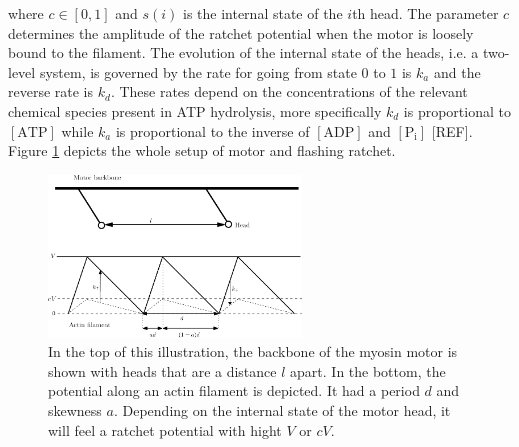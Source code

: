 \documentclass[aps,pre,onecolumn,showpacs,showkeys,a4paper]{revtex4}
\begin{document}
where $c\in\left[0,1\right]$ and $s(i)$ is the internal state of the $i$th head. 
The parameter $c$ determines the amplitude of the ratchet potential when the motor is loosely bound to the filament. 
The evolution of the internal state of the heads, i.e. a two-level system, is governed by the rate for going from state $0$ to $1$ is $k_{a}$ and the reverse rate is $k_{d}$.
These rates depend on the concentrations of the relevant chemical species present in ATP hydrolysis, more specifically $k_{d}$ is proportional to $[\text{ATP}]$ while $k_{a}$ is proportional to the inverse of $[\text{ADP}]$ and $[\text{P}_\text{i}]$ [REF]. 
Figure \ref{Fig: ratchet setup} depicts the whole setup of motor and flashing ratchet. 
\begin{figure}[h]
\centering
\includegraphics[width=0.6\textwidth,height=!]{ratchet_illustration}
\caption{In the top of this illustration, the backbone of the myosin motor is shown with heads that are a distance $l$ apart. 
In the bottom, the potential along an actin filament is depicted. 
It had a period $d$ and skewness $a$. 
Depending on the internal state of the motor head, it will feel a ratchet potential with hight $V$ or $cV$.} 
\label{Fig: ratchet setup}
\end{figure}
\end{document}
